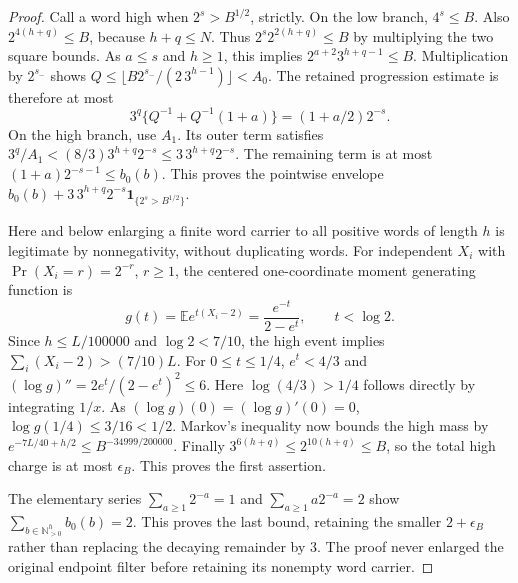 \begin{proof}
Call a word high when $2^s>B^{1/2}$, strictly. On the low branch,
$4^s\le B$. Also $2^{4(h+q)}\le B$, because $h+q\le N$.
Thus $2^s2^{2(h+q)}\le B$ by multiplying the two square bounds.
As $a\le s$ and $h\ge1$, this implies
$2^{a+2}3^{h+q-1}\le B$. Multiplication by $2^{s_-}$ shows
$Q\le\lfloor B2^{s_-}/(2\,3^{h-1})\rfloor<A_0$.
The retained progression estimate is therefore at most
\[
 3^q\{Q^{-1}+Q^{-1}(1+a)\}=(1+a/2)2^{-s}.
\]
On the high branch, use $A_1$. Its outer term satisfies
$3^q/A_1<(8/3)3^{h+q}2^{-s}\le3\,3^{h+q}2^{-s}$.
The remaining term is at most $(1+a)2^{-s-1}\le b_0(b)$.
This proves the pointwise envelope
$b_0(b)+3\,3^{h+q}2^{-s}\mathbf1_{\{2^s>B^{1/2}\}}$.

Here and below enlarging a finite word carrier to all positive words
of length $h$ is legitimate by nonnegativity, without duplicating words.
For independent $X_i$ with $\Pr(X_i=r)=2^{-r}$, $r\ge1$, the centered
one-coordinate moment generating function is
\[
 g(t)=\mathbb E e^{t(X_i-2)}
     =\frac{e^{-t}}{2-e^t},\qquad t<\log2.
\]
Since $h\le L/100000$ and $\log2<7/10$, the high event implies
$\sum_i(X_i-2)>(7/10)L$.
For $0\le t\le1/4$, $e^t<4/3$ and
$(\log g)''=2e^t/(2-e^t)^2\le6$.
Here $\log(4/3)>1/4$ follows directly by integrating $1/x$.
As $(\log g)(0)=(\log g)'(0)=0$, $\log g(1/4)\le3/16<1/2$.
Markov's inequality now bounds the high mass by
$e^{-7L/40+h/2}\le B^{-34999/200000}$.
Finally $3^{6(h+q)}\le2^{10(h+q)}\le B$, so the total high charge
is at most $\epsilon_B$. This proves the first assertion.

The elementary series $\sum_{a\ge1}2^{-a}=1$ and
$\sum_{a\ge1}a2^{-a}=2$ show
$\sum_{b\in\mathbb N_{>0}^h}b_0(b)=2$.
This proves the last bound, retaining the smaller $2+\epsilon_B$
rather than replacing the decaying remainder by $3$.
The proof never enlarged the original endpoint filter before retaining
its nonempty word carrier.
\end{proof}

